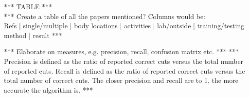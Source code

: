 *** TABLE *** \\
*** Create a table of all the papers mentioned? Columns would be:\\
Refs | single/multiple | body locations | activities | lab/outside | training/testing method | result ***


*** Elaborate on measures, e.g. precision, recall, confusion matrix etc.  ***
*** Precision is defined as the ratio of reported correct cuts versus the total number of reported cuts. Recall is defined as the ratio of reported correct cuts versus the total number of correct cuts. The closer precision and recall are to 1, the more accurate the algorithm is. ***



